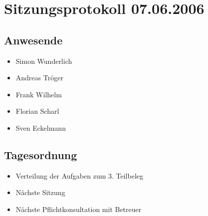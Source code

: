 		\section{Sitzungsprotokoll 07.06.2006}
		\subsection{Anwesende}
		\begin{itemize}
			\item Simon Wunderlich
			\item Andreas Tröger
			\item Frank Wilhelm
			\item Florian Scharl
			\item Sven Eckelmann
		\end{itemize}
		\subsection{Tagesordnung}
		\begin{itemize}
			\item Verteilung der Aufgaben zum 3. Teilbeleg
			\item Nächste Sitzung
			\item Nächste Pflichtkonsultation mit Betreuer
		\end{itemize}
